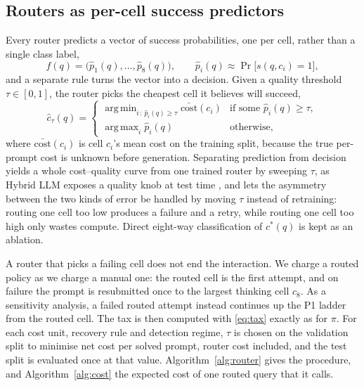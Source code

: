 \documentclass[final,5p,times,twocolumn]{elsarticle}
\theoremstyle{plain}
\newcommand{\cstar}{c^{*}}
\newcommand{\cost}{\mathrm{cost}}
\DeclareMathOperator*{\argmin}{arg\,min}
\DeclareMathOperator*{\argmax}{arg\,max}
\begin{document}
\subsection{Routers as per-cell success predictors}
\label{sec:routers}

Every router predicts a vector of success probabilities, one per cell, rather
than a single class label,
\begin{equation}
  f(q) = \bigl(\hat{p}_1(q), \dots, \hat{p}_8(q)\bigr), \qquad
  \hat{p}_i(q) \approx \Pr\bigl[s(q, c_i) = 1\bigr],
  \label{eq:router}
\end{equation}
and a separate rule turns the vector into a decision. Given a quality
threshold $\tau \in [0, 1]$, the router picks the cheapest cell it believes
will succeed,
\begin{equation}
  \hat{c}_\tau(q) =
  \begin{cases}
    \displaystyle\argmin_{i \,:\, \hat{p}_i(q) \geq \tau} \bar{\cost}(c_i)
      & \text{if some } \hat{p}_i(q) \geq \tau,\\[1.2ex]
    \displaystyle\argmax_{i} \hat{p}_i(q) & \text{otherwise},
  \end{cases}
  \label{eq:selection}
\end{equation}
where $\bar{\cost}(c_i)$ is cell $c_i$'s mean cost on the training split,
because the true per-prompt cost is unknown before generation. Separating
prediction from decision yields a whole cost--quality curve from one trained
router by sweeping $\tau$, as Hybrid LLM exposes a quality knob at test time
\cite{ding2024hybridllm}, and lets the asymmetry between the two kinds of
error be handled by moving $\tau$ instead of retraining: routing one cell too
low produces a failure and a retry, while routing one cell too high only
wastes compute. Direct eight-way classification of $\cstar(q)$ is kept as an
ablation.

A router that picks a failing cell does not end the interaction. We charge a
routed policy as we charge a manual one: the routed cell is the first
attempt, and on failure the prompt is resubmitted once to the largest
thinking cell $c_8$. As a sensitivity analysis, a failed routed attempt
instead continues up the P1 ladder from the routed cell. The tax is then
computed with \eqref{eq:tax} exactly as for $\pi$. For each cost unit,
recovery rule and detection regime, $\tau$ is chosen on the validation split
to minimise net cost per solved prompt, router cost included, and the test
split is evaluated once at that value. Algorithm~\ref{alg:router} gives the
procedure, and Algorithm~\ref{alg:cost} the expected cost of one routed query
that it calls.
\end{document}

